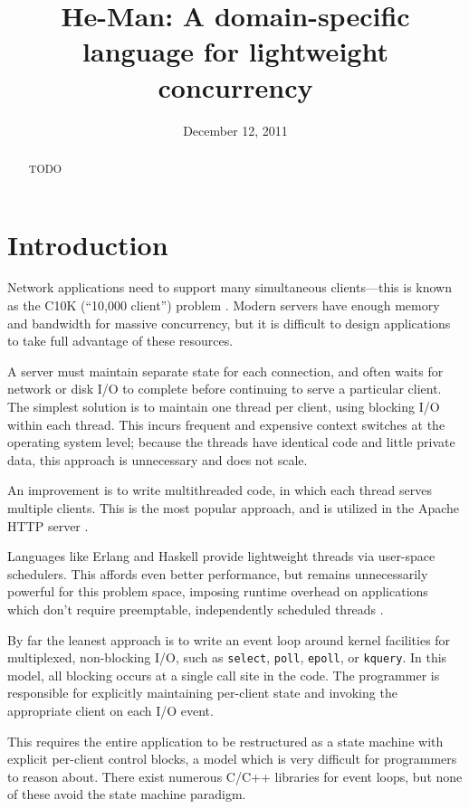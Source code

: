 \documentclass[preprint,11pt]{sigplanconf}
\title{He-Man: A domain-specific language for lightweight concurrency}
\date{December 12, 2011}
\renewcommand{\t}{\texttt}
\begin{document}
\maketitle

\begin{abstract}
TODO
\end{abstract}

\section{Introduction}

Network applications need to support many simultaneous clients---this is known
as the C10K (``10,000 client'') problem \cite{Kegel}. Modern servers have enough
memory and bandwidth for massive concurrency, but it is difficult to design
applications to take full advantage of these resources.

A server must maintain separate state for each connection, and often waits for
network or disk I/O to complete before continuing to serve a particular client.
The simplest solution is to maintain one thread per client, using blocking I/O
within each thread. This incurs frequent and expensive context switches at the
operating system level; because the threads have identical code and little
private data, this approach is unnecessary and does not scale.

An improvement is to write multithreaded code, in which each thread serves
multiple clients. This is the most popular approach, and is utilized in the
Apache HTTP server \cite{Apache}.

Languages like Erlang and Haskell provide lightweight threads via user-space
schedulers. This affords even better performance, but remains unnecessarily
powerful for this problem space, imposing runtime overhead on applications which
don't require preemptable, independently scheduled threads \cite{Vinoski}.

By far the leanest approach is to write an event loop around kernel facilities
for multiplexed, non-blocking I/O, such as \t{select}, \t{poll}, \t{epoll}, or
\t{kquery}. In this model, all blocking occurs at a single call site in the
code. The programmer is responsible for explicitly maintaining per-client state
and invoking the appropriate client on each I/O event.

This requires the entire application to be restructured as a state machine with
explicit per-client control blocks, a model which is very difficult for
programmers to reason about. There exist numerous C/C++ libraries for event
loops, but none of these avoid the state machine paradigm.
\end{document}

